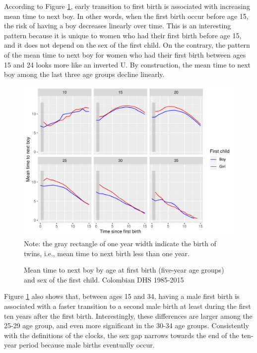 \documentclass{article}
\begin{document}
According to Figure \ref{fert_02}, early transition to first birth is associated with increasing mean time to next boy. In other words, when the first birth occur before age 15, the risk of having a boy decreases linearly over time. This is an interesting pattern because it is unique to women who had their first birth before age 15, and it does not depend on the sex of the first child. On the contrary, the pattern of the mean time to next boy for women who had their first birth between ages 15 and 24 looks more like an inverted U. By construction, the mean time to next boy among the last three age groups decline linearly.

\begin{figure}[H]
 \centering
    \caption{Mean time to next boy by age at first birth (five-year age groups) and sex of the first child. Colombian DHS 1985-2015}
    \includegraphics[scale=0.8]{Spells/Figures/mt_second_boy_by_sex_first_cohort.pdf}\\
    \label{fert_02}
    Note: the gray rectangle of one year width indicate the birth of twins, i.e., mean time to next birth less than one year.
\end{figure}

Figure \ref{fert_02} also shows that, between ages 15 and 34, having a male first birth is associated with a faster transition to a second male birth at least during the first ten years after the first birth. Interestingly, these differences are larger among the 25-29 age group, and even more significant in the 30-34 age groups. Consistently with the definitions of the clocks, the sex gap narrows towards the end of the ten-year period because male births eventually occur. 
\end{document}
